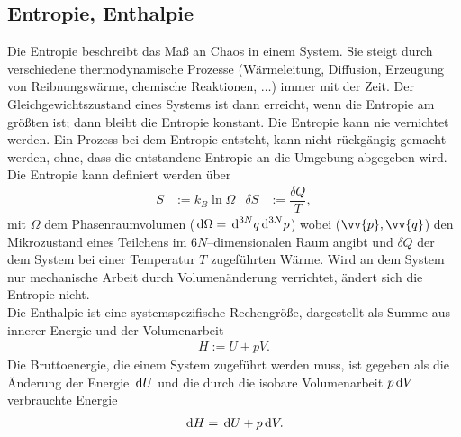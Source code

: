 \subsection{Entropie, Enthalpie}
Die Entropie beschreibt das Maß an Chaos in einem System.
Sie steigt durch verschiedene thermodynamische Prozesse (Wärmeleitung, Diffusion, Erzeugung von Reibnungswärme, chemische Reaktionen, $\hdots$) immer mit der Zeit.
Der Gleichgewichtszustand eines Systems ist dann erreicht, wenn die Entropie am größten ist; dann bleibt die Entropie konstant.
Die Entropie kann nie vernichtet werden.
Ein Prozess bei dem Entropie entsteht, kann nicht rückgängig gemacht werden, ohne, dass die entstandene Entropie an die Umgebung abgegeben wird.\\\indent
Die Entropie kann definiert werden über
\begin{align} 
        S&:=k_B\ln \Omega &\delta S&:=\dfrac{\delta Q}{T}
,\end{align} 
mit $\Omega $ dem Phasenraumvolumen ($\,\text{d} \Omega =\,\text{d}^{3N}q\,\text{d}^{3N}p$) wobei ($\vv{p},\vv{q}$) den Mikrozustand eines Teilchens im $6N$--dimensionalen Raum angibt und $\delta Q$ der dem System bei einer Temperatur $T$ zugeführten Wärme.
Wird an dem System nur mechanische Arbeit durch Volumenänderung verrichtet, ändert sich die Entropie nicht.\\\indent 
Die Enthalpie ist eine systemspezifische Rechengröße, dargestellt als Summe aus innerer Energie und der Volumenarbeit
\begin{align} 
        H:=U+pV
.\end{align} 
Die \glqq Bruttoenergie\grqq{}, die einem System zugeführt werden muss, ist gegeben als die Änderung der Energie $\,\text{d} U$ und die durch die isobare Volumenarbeit $p\,\text{d} V$ verbrauchte Energie
\begin{align} 
        \,\text{d} H=\,\text{d} U+p\,\text{d} V
.\end{align} 
